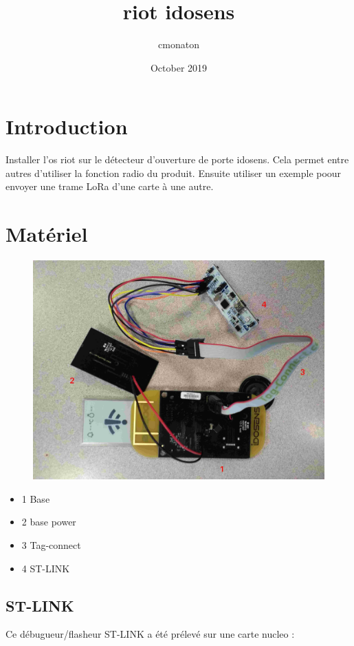 \documentclass{article}
\title{riot idosens}
\author{cmonaton }
\date{October 2019}
\begin{document}
\maketitle

\section{Introduction}
Installer l'os riot sur le détecteur d'ouverture de porte idosens. Cela permet entre autres d'utiliser la fonction radio du produit. Ensuite utiliser un exemple poour envoyer une trame LoRa d'une carte à une autre.

\section{Matériel}

\begin{figure}[H]
\begin{center}
\advance\leftskip-3cm
\advance\rightskip-3cm
\includegraphics[keepaspectratio=true,scale=0.1]{idosens_numerote.jpg}
\label{visina8}
\end{center}\end{figure}

\begin{itemize}
    \item 1  Base
    \item{2} base power
    \item 3 Tag-connect
    \item 4 ST-LINK
\end{itemize}

\subsection{ST-LINK}
Ce débugueur/flasheur ST-LINK a été prélevé sur une carte nucleo :
\end{document}
